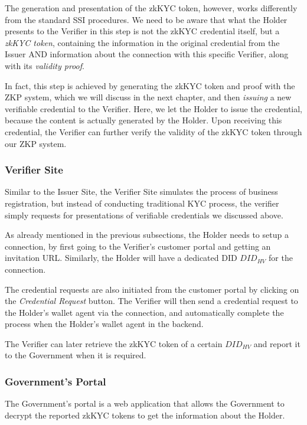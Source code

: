 \documentclass[
]{report}
\begin{document}
The generation and presentation of the zkKYC token, however, works
differently from the standard SSI procedures. We need to be aware that
what the Holder presents to the Verifier in this step is not the zkKYC
credential itself, but a \emph{zkKYC token}, containing the information in
the original credential from the Issuer AND information about the connection
with this specific Verifier, along with its \emph{validity proof}.

In fact, this step is achieved by generating the zkKYC token and proof
with the ZKP system, which we will discuss in the next chapter, and then
\emph{issuing} a new verifiable credential to the Verifier. Here, we let
the Holder to issue the credential, because the content is actually
generated by the Holder. Upon receiving this credential, the Verifier
can further verify the validity of the zkKYC token through our ZKP system.

\subsubsection{Verifier Site}
Similar to the Issuer Site, the Verifier Site simulates the process of
business registration, but instead of conducting traditional KYC process,
the verifier simply requests for presentations of verifiable credentials
we discussed above.

As already mentioned in the previous subsections, the Holder needs to
setup a connection, by first going to the Verifier's customer portal and
getting an invitation URL. Similarly, the Holder will have a dedicated DID
$DID_{HV}$ for the connection.

The credential requests are also initiated from the customer portal by
clicking on the \emph{Credential Request} button. The Verifier will then
send a credential request to the Holder's wallet agent via the connection,
and automatically complete the process when the Holder's wallet agent in
the backend.

The Verifier can later retrieve the zkKYC token of a certain ${DID_{HV}}$
and report it to the Government when it is required.

\subsubsection{Government's Portal}
The Government's portal is a web application that allows the Government to
decrypt the reported zkKYC tokens to get the information about the Holder.
\end{document}
